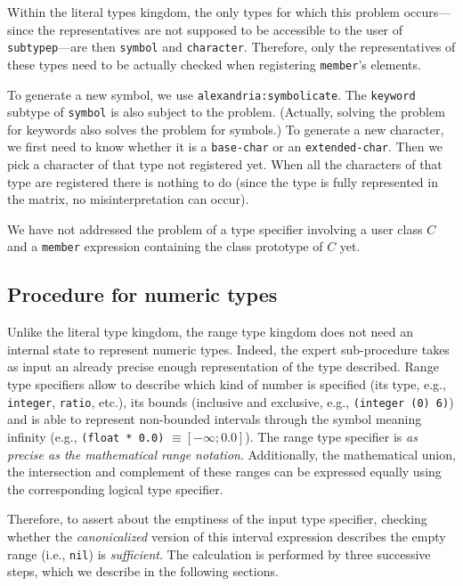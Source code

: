 \documentclass[format=sigconf]{acmart}
\newcommand\code[2][\small]{\sloppy\texttt{#1#2}}
\theoremstyle{definition}
\begin{document}
Within the literal types kingdom, the only types for which this problem
occurs---since the representatives are not supposed to be accessible to the user
of \code{subtypep}---are then \code{symbol} and \code{character}.
Therefore, only the representatives of these types need to be actually checked
when registering \code{member}'s elements.

To generate a new symbol, we use \code{alexandria:symbolicate}.
The \code{keyword} subtype of \code{symbol} is also subject to the problem.
(Actually, solving the problem for keywords also solves the problem for
symbols.)
To generate a new character, we first need to know whether it is a
\code{base-char} or an \code{extended-char}. Then we pick a character of that
type not registered yet. When all the characters of that type are registered
there is nothing to do (since the type is fully represented in the matrix, no
misinterpretation can occur).

We have not addressed the problem of a type
specifier involving a user class $C$ and a \code{member} expression containing
the class prototype of $C$ yet.

\subsection{Procedure for numeric types}
\label{sec:expnum}
Unlike the literal type kingdom, the range type kingdom does not need an
internal state to represent numeric types. Indeed, the expert sub-procedure
takes as input an already precise enough representation of the type described.
Range type specifiers allow to describe which kind of number is specified (its
type, e.g., \code{integer}, \code{ratio}, etc.), its bounds (inclusive and
exclusive, e.g., \code{(integer (0) 6)}) and is able to represent non-bounded
intervals through the symbol \code{*} meaning infinity (e.g., \code{(float *
  0.0)} $\equiv \left[-\infty; 0.0\right]$). The range type specifier is
\emph{as precise as the mathematical range notation}. Additionally, the
mathematical union, the intersection and complement of these ranges can
be expressed equally using the corresponding logical type specifier.

Therefore, to assert about the emptiness of the input type specifier, checking
whether the \emph{canonicalized} version of this interval expression describes
the empty range (i.e., \code{nil}) is \emph{sufficient}.
The calculation is performed by three successive steps, which we describe in the
following sections.
\end{document}
